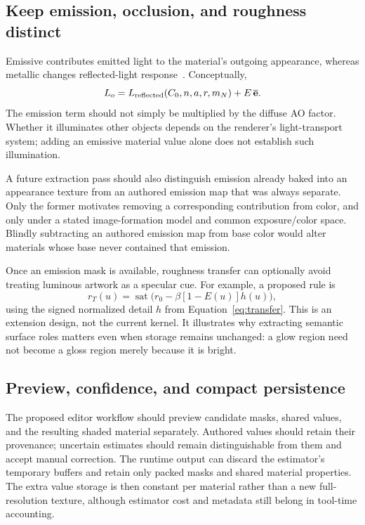\documentclass[11pt,letterpaper]{article}
\newcommand{\sat}{\operatorname{sat}}
\begin{document}
\subsection{Keep emission, occlusion, and roughness distinct}
Emissive contributes emitted light to the material's outgoing appearance, whereas metallic changes reflected-light response~\cite{gltf2}. Conceptually,
\begin{equation}
L_o= L_{\rm reflected}(C_0,n,a,r,m_N) + E\,\overline{\mathbf e}.
\label{eq:emissioncompose}
\end{equation}
The emission term should not simply be multiplied by the diffuse AO factor. Whether it illuminates other objects depends on the renderer's light-transport system; adding an emissive material value alone does not establish such illumination.

A future extraction pass should also distinguish emission already baked into an appearance texture from an authored emission map that was always separate. Only the former motivates removing a corresponding contribution from color, and only under a stated image-formation model and common exposure/color space. Blindly subtracting an authored emission map from base color would alter materials whose base never contained that emission.

Once an emission mask is available, roughness transfer can optionally avoid treating luminous artwork as a specular cue. For example, a proposed rule is
\begin{equation}
r_T(u)=\sat\bigl(r_0-\beta[1-E(u)]h(u)\bigr),
\label{eq:emissionroughness}
\end{equation}
using the signed normalized detail $h$ from Equation~\eqref{eq:transfer}. This is an extension design, not the current kernel. It illustrates why extracting semantic surface roles matters even when storage remains unchanged: a glow region need not become a gloss region merely because it is bright.

\subsection{Preview, confidence, and compact persistence}
The proposed editor workflow should preview candidate masks, shared values, and the resulting shaded material separately. Authored values should retain their provenance; uncertain estimates should remain distinguishable from them and accept manual correction. The runtime output can discard the estimator's temporary buffers and retain only packed masks and shared material properties. The extra value storage is then constant per material rather than a new full-resolution texture, although estimator cost and metadata still belong in tool-time accounting.
\end{document}
